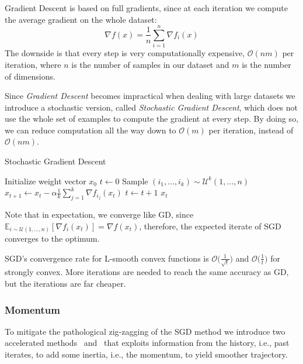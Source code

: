Gradient Descent is based on full gradients, since at each iteration we compute the average gradient on the whole dataset:
$$
\nabla f(x) = \frac{1}{n} \sum_{i=1}^n \nabla f_i(x)
$$
The downside is that every step is very computationally expensive, $\mathcal{O}(nm)$ per iteration, where $n$ is the number of samples in our dataset and $m$ is the number of dimensions.

Since \emph{Gradient Descent} becomes impractical when dealing with large datasets we introduce a stochastic version, called \emph{Stochastic Gradient Descent}, which does not use the whole set of examples to compute the gradient at every step. By doing so, we can reduce computation all the way down to $\mathcal{O}(m)$ per iteration, instead of $\mathcal{O}(nm)$.

\begin{algorithm}[H]
	\caption{Stochastic Gradient Descent}
	\label{alg:sgd}
	\begin{algorithmic}
			\State Initialize weight vector $x_0$
			\State $t \gets 0$
				\State Sample $(i_1,\dots,i_k) \sim \mathcal{U}^k(1,\dots,n)$ 
				\State $\displaystyle x_{t+1} \gets x_t - \alpha \frac{1}{k} \sum_{j=1}^k \nabla f_{i_j}(x_t)$
				\State $t \gets t + 1$
			\EndWhile
			\State \Return $x_t$
		\EndFunction
	\end{algorithmic}
\end{algorithm}

Note that in expectation, we converge like GD, since $\displaystyle \mathbb{E}_{i \sim \mathcal{U}(1,\dots,n)}[\nabla f_i(x_t)] = \nabla f(x_t)$, therefore, the expected iterate of SGD converges to the optimum.

SGD’s convergence rate for L-smooth convex functions is $\displaystyle \mathcal{O}\Big(\frac{1}{\sqrt{t}}\Big)$ and $\displaystyle \mathcal{O}\Big(\frac{1}{t}\Big)$ for strongly convex. More iterations are needed to reach the same accuracy as GD, but the iterations are far cheaper.

\subsubsection{Momentum}

To mitigate the pathological zig-zagging of the SGD method we introduce two accelerated methods~\cite{polyak1964some} and~\cite{nesterov1998introductory} that exploits information from the history, i.e., past iterates, to add some inertia, i.e., the momentum, to yield smoother trajectory.


